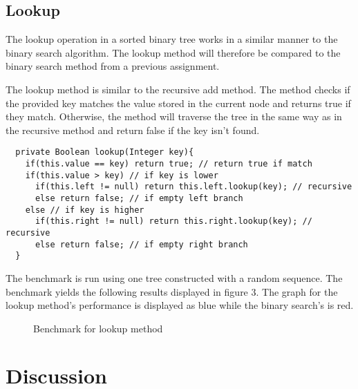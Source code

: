 \documentclass[a4paper,11pt]{article}
\begin{document}
\subsection*{Lookup}

The lookup operation in a sorted binary tree works in a similar manner 
to the binary search algorithm. The lookup method will therefore be 
compared to the binary search method from a previous assignment.

The lookup method is similar to the recursive add method. The method
checks if the provided key matches the value stored in the current node
and returns true if they match. Otherwise, the method will traverse the 
tree in the same way as in the recursive method and return false if the 
key isn't found.

\begin{verbatim}
  private Boolean lookup(Integer key){
    if(this.value == key) return true; // return true if match
    if(this.value > key) // if key is lower
      if(this.left != null) return this.left.lookup(key); // recursive
      else return false; // if empty left branch
    else // if key is higher
      if(this.right != null) return this.right.lookup(key); // recursive
      else return false; // if empty right branch
  }
\end{verbatim}

The benchmark is run using one tree constructed with a random sequence.
The benchmark yields the following results displayed in figure 3. The 
graph for the lookup method's performance is displayed as blue while 
the binary search's is red.

\begin{figure}[ht!]
  \centering
  \caption{Benchmark for lookup method}
  \label{fig:plot5}
\end{figure}

\section*{Discussion}
\end{document}
